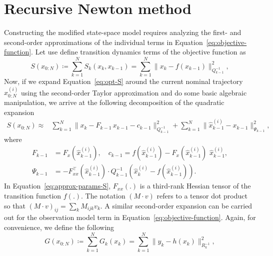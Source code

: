 \documentclass[dissertation,math,vertlayout,pdfa,colorlinks,nologo]{aaltoseries}
\begin{document}
\section{Recursive Newton method}
Constructing the modified state-space model requires analyzing the first- and second-order approximations of the individual terms in Equation~\eqref{eq:objective-function}. Let use define transition dynamics terms of the objective function as
\begin{equation} \label{eq:opt-S}
    S(x_{0:N}) \coloneqq \sum_{k=1}^{N} S_{k}(x_{k}, x_{k-1}) = \sum_{k=1}^{N} \lVert x_{k} - f(x_{k-1}) \rVert^{2}_{Q_{k-1}^{-1}},
\end{equation}
Now, if we expand Equation~\eqref{eq:opt-S} around the current nominal trajectory $\hat{x}^{(i)}_{0:N}$ using the second-order Taylor approximation and do some basic algebraic manipulation, we arrive at the following decomposition of the quadratic expansion 
\begin{equation} \label{eq:modified_transition}
    \begin{split}
    S(x_{0:N}) \approx
        & \sum_{k=1}^{N} \lVert x_{k} - F_{k-1} \, x_{k-1} - c_{k-1} \rVert^{2}_{Q_{k-1}^{-1}} + \sum_{k=1}^{N} \lVert \hat{x}^{(i)}_{k-1} - x_{k-1} \rVert^{2}_{\Psi_{k-1}},
    \end{split}
\end{equation}
where
\begin{equation} \label{eq:approx-params-S}
    \begin{split}
        F_{k-1} &= F_{x}(\hat{x}^{(i)}_{k - 1}), \quad c_{k-1} = f(\hat{x}^{(i)}_{k - 1}) - F_x(\hat{x}^{(i)}_{k - 1}) \, \,  \hat{x}^{(i)}_{k - 1}, \\
        \Psi_{k-1} &= - F^{\top}_{x x}(\hat{x}^{(i)}_{k - 1}) \cdot Q_{k-1}^{-1} (\hat{x}^{(i)}_k - f(\hat{x}^{(i)}_{k - 1})).
    \end{split}
\end{equation}
In Equation~\eqref{eq:approx-params-S}, $F_{x x}(.)$ is a third-rank Hessian tensor of the transition function $f(.)$. The notation $(M \cdot v)$ refers to a tensor dot product so that $(M \cdot v)_{ij} = \sum_{k} M_{ijk} v_{k}$.
A similar second-order expansion can be carried out for the observation model term in Equation~\eqref{eq:objective-function}. Again, for convenience, we define the following
\begin{equation} \label{eq:opt-G}
    G(x_{0:N}) \coloneqq \sum_{k=1}^{N} G_{k}(x_{k}) = \sum_{k=1}^{N} \lVert y_{k} - h(x_{k}) \rVert^{2}_{R_k^{-1}},
\end{equation}
\end{document}
